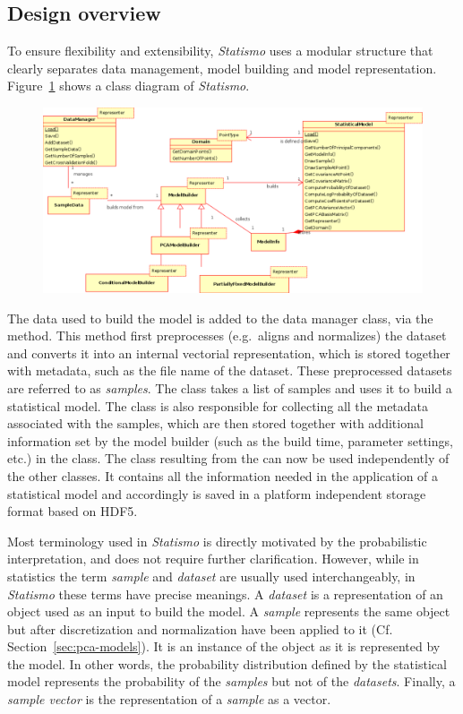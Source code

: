 \documentclass{InsightArticle}
\newcommand{\Statismo}{\emph{Statismo}\xspace}
\begin{document}
\subsection{Design overview}\label{sec:design-overview}
To ensure flexibility and  extensibility, \Statismo uses a modular structure that clearly separates 
data management, model building and model representation. 
Figure~\ref{fig:class-diagram} shows a class diagram of \Statismo.
\begin{figure}
  \includegraphics[width=\textwidth]{pictures/class_diagram.pdf}
  \itkcaption{The core classes in \Statismo}
  \label{fig:class-diagram}
\end{figure}
The data used to build the model is added to the data manager
 class, via the  method. This
method first preprocesses (e.g.\ aligns and normalizes) the dataset
and converts it into an internal vectorial representation, which is
stored together with metadata, such as the file name of the dataset. These
preprocessed datasets are referred to as \emph{samples}. The
 class takes a list of samples and uses it to build
a statistical model. The  class is also responsible
for collecting all the metadata associated with the samples, which are then
stored together with additional information set by the model builder (such as
the build time, parameter settings, etc.) in the 
class. The  class resulting from the
 can now be used independently of the other
classes. It contains all the information needed in the application of
a statistical model and accordingly is saved in a platform independent storage format 
based on HDF5. 

Most terminology used in \Statismo is directly motivated by the
probabilistic interpretation, and does not require further
clarification.  However, while in statistics the term \emph{sample} and
\emph{dataset} are usually used interchangeably, in \Statismo these terms have precise
meanings.  A \emph{dataset} is a representation of an object used as an input to build the model.  A \emph{sample}
represents the same object but after discretization and normalization have been applied
to it (Cf. Section~\ref{sec:pca-models}).  It is an instance of the
object as it is represented by the model.  In other words, the probability distribution defined by the statistical model 
represents the probability of the \emph{samples} but not of the \emph{datasets}. 
Finally, a \emph{sample
 vector} is the representation of a \emph{sample} as a vector. 
\end{document}
